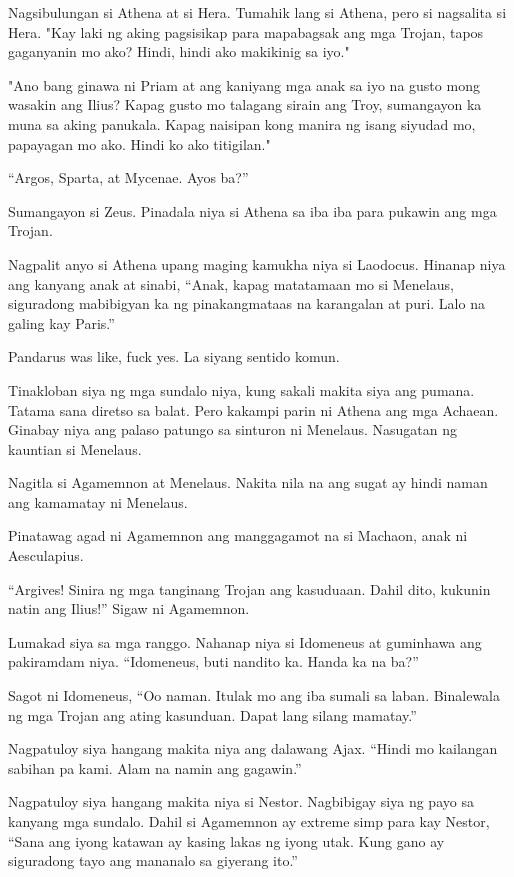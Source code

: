 \documentclass[12pt,letterpaper]{report}
\begin{document}
Nagsibulungan si Athena at si Hera. Tumahik lang si Athena, pero si nagsalita si Hera. "Kay laki ng aking pagsisikap para mapabagsak ang mga Trojan, tapos gaganyanin mo ako?
Hindi, hindi ako makikinig sa iyo."

"Ano bang ginawa ni Priam at ang kaniyang mga anak sa iyo na gusto mong wasakin ang Ilius?
Kapag gusto mo talagang sirain ang Troy, sumangayon ka muna sa aking panukala. Kapag naisipan kong manira ng isang siyudad mo, papayagan mo ako. Hindi ko ako titigilan."

``Argos, Sparta, at Mycenae. Ayos ba?''

Sumangayon si Zeus. Pinadala niya si Athena sa iba iba para pukawin ang mga Trojan.

Nagpalit anyo si Athena upang maging kamukha niya si Laodocus. Hinanap niya ang kanyang anak at sinabi, ``Anak, kapag matatamaan mo si Menelaus, siguradong mabibigyan ka ng pinakangmataas na karangalan at puri. Lalo na galing kay Paris.''

Pandarus was like, fuck yes. La siyang sentido komun.

Tinakloban siya ng mga sundalo niya, kung sakali makita siya ang pumana. Tatama sana diretso sa balat. Pero kakampi parin ni Athena ang mga Achaean. Ginabay niya ang palaso patungo sa sinturon ni Menelaus. Nasugatan ng kauntian si Menelaus.

Nagitla si Agamemnon at Menelaus. Nakita nila na ang sugat ay hindi naman ang kamamatay ni Menelaus.

Pinatawag agad ni Agamemnon ang manggagamot na si Machaon, anak ni Aesculapius.

``Argives! Sinira ng mga tanginang Trojan ang kasuduaan. Dahil dito, kukunin natin ang Ilius!'' Sigaw ni Agamemnon.

Lumakad siya sa mga ranggo. Nahanap niya si Idomeneus at guminhawa ang pakiramdam niya. ``Idomeneus, buti nandito ka. Handa ka na ba?''

Sagot ni Idomeneus, ``Oo naman. Itulak mo ang iba sumali sa laban. Binalewala ng mga Trojan ang ating kasunduan. Dapat lang silang mamatay.''

Nagpatuloy siya hangang makita niya ang dalawang Ajax. ``Hindi mo kailangan sabihan pa kami. Alam na namin ang gagawin.''

Nagpatuloy siya hangang makita niya si Nestor. Nagbibigay siya ng payo sa kanyang mga sundalo. Dahil si Agamemnon ay extreme simp para kay Nestor, ``Sana ang iyong katawan ay kasing lakas ng iyong utak. Kung gano ay siguradong tayo ang mananalo sa giyerang ito.''
\end{document}
